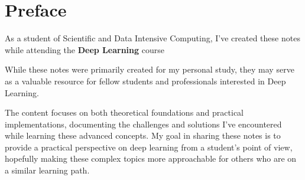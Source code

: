 \chapter*{Preface}

As a student of Scientific and Data Intensive Computing, I've created these notes while attending the \textbf{Deep Learning} course

While these notes were primarily created for my personal study, they may serve as a valuable resource for fellow students and professionals interested in Deep Learning.

The content focuses on both theoretical foundations and practical implementations, documenting the challenges and solutions I've encountered while learning these advanced concepts. My goal in sharing these notes is to provide a practical perspective on deep learning from a student's point of view, hopefully making these complex topics more approachable for others who are on a similar learning path.